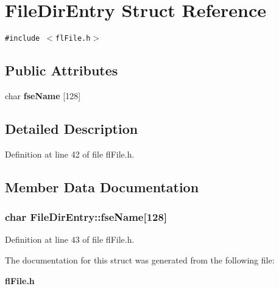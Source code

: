 \section{File\-Dir\-Entry Struct Reference}
\label{structFileDirEntry}
{\tt \#include $<$fl\-File.h$>$}

\subsection*{Public Attributes}
\begin{CompactItemize}
\item 
char {\bf fse\-Name} [128]
\end{CompactItemize}


\subsection{Detailed Description}




Definition at line 42 of file fl\-File.h.

\subsection{Member Data Documentation}
\subsubsection{\setlength{\rightskip}{0pt plus 5cm}char {\bf File\-Dir\-Entry::fse\-Name}[128]}\label{structFileDirEntry_e3d3fedeea11e13a29489ad919b88a8d}




Definition at line 43 of file fl\-File.h.

The documentation for this struct was generated from the following file:\begin{CompactItemize}
\item 
{\bf fl\-File.h}\end{CompactItemize}
